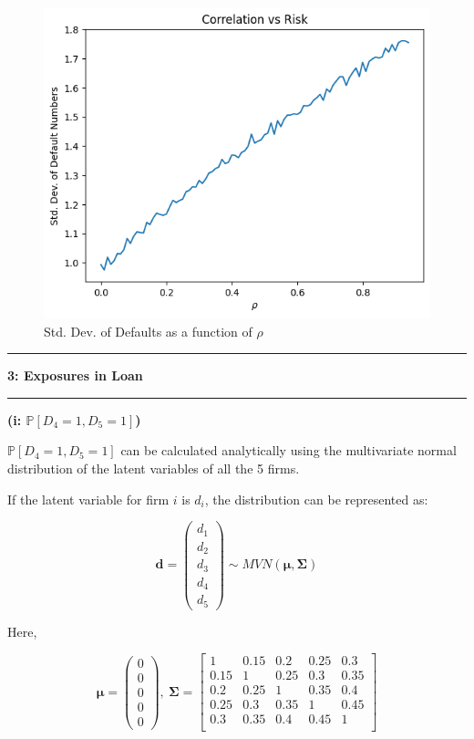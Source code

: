 \documentclass[11pt]{article}
\newcommand\question[2]{\vspace{.25in}\hrule\textbf{#1: #2}\vspace{.5em}\hrule\vspace{.10in}}
\renewcommand\part[1]{\vspace{.10in}\textbf{(#1)}}
\renewcommand{\P}{\mathbb{P}}
\begin{document}
\begin{figure}[h]
\centering
\includegraphics[scale=0.51]{Q2.png}
\caption{Std. Dev. of Defaults as a function of $\rho$}
\label{Fig:Q2}
\end{figure}

\newpage

\question{3}{Exposures in Loan}

\part{i: $\P[D_4 = 1, D_5 = 1]$}

$\P[D_4 = 1, D_5 = 1]$ can be calculated analytically 
using the multivariate normal distribution of the latent variables
of all the 5 firms.

If the latent variable for firm $i$ is $d_i$, the distribution can
be represented as:

$$
\mathbf{d} = \begin{pmatrix}
d_1 \\
d_2 \\
d_3 \\
d_4 \\
d_5
\end{pmatrix}
\sim
MVN(\mathbf{\mu}, \mathbf{\Sigma})
$$

Here,

$$
\mathbf{\mu} = \begin{pmatrix}
0 \\
0 \\
0 \\
0 \\
0
\end{pmatrix}, \
\mathbf{\Sigma} = \begin{bmatrix}
1 & 0.15 & 0.2 & 0.25 & 0.3 \\
0.15 & 1 & 0.25 & 0.3 & 0.35 \\
0.2 & 0.25 & 1 & 0.35 & 0.4 \\
0.25 & 0.3 & 0.35 & 1 & 0.45 \\
0.3 & 0.35 & 0.4 & 0.45 & 1 \\
\end{bmatrix}
$$
\end{document}
